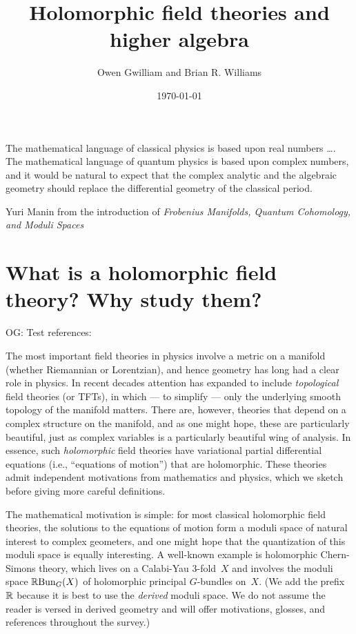 \documentclass[11pt]{amsart}
\author{Owen Gwilliam and Brian R. Williams}
\date{\today}
\title{Holomorphic field theories and higher algebra}
\def\owen#1{{\textcolor{violet!50!black}{OG: {#1}}}}
\begin{document}

\maketitle

\epigraph{The mathematical language of classical physics is based upon real numbers \dots. The mathematical language of quantum physics is based upon complex numbers, and it would be natural to expect that the complex analytic and the algebraic geometry should replace the differential geometry of the classical period.}{Yuri Manin from the introduction of {\it Frobenius Manifolds, Quantum Cohomology, and Moduli Spaces}}

\tableofcontents


\section{What is a holomorphic field theory? Why study them?}

\owen{Test references:} \cite{CG1}

The most important field theories in physics involve a metric on a manifold (whether Riemannian or Lorentzian), and hence geometry has long had a clear role in physics.
In recent decades attention has expanded to include {\em topological} field theories (or TFTs), 
in which --- to simplify --- only the underlying smooth topology of the manifold matters.
There are, however, theories that depend on a complex structure on the manifold,
and as one might hope, these are particularly beautiful, 
just as complex variables is a particularly beautiful wing of analysis.
In essence, such {\em holomorphic} field theories have variational partial differential equations (i.e., ``equations of motion'') that are holomorphic.
These theories admit independent motivations from mathematics and physics,
which we sketch before giving more careful definitions.

The mathematical motivation is simple:
for most classical holomorphic field theories, the solutions to the equations of motion form a moduli space of natural interest to complex geometers,
and one might hope that the quantization of this moduli space is equally interesting.
A well-known example is holomorphic Chern-Simons theory,
which lives on a Calabi-Yau 3-fold~$X$ and involves the moduli space $\mathbb R{\rm Bun}_G(X)$ of holomorphic principal $G$-bundles on~$X$.
(We add the prefix $\mathbb R$ because it is best to use the {\em derived} moduli space.
We do not assume the reader is versed in derived geometry and will offer motivations, glosses, and references throughout the survey.)
\end{document}

